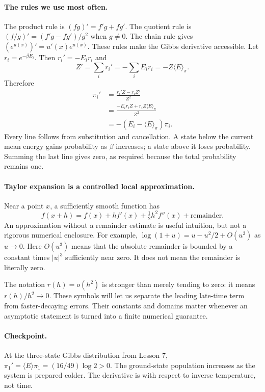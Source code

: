 \paragraph{The rules we use most often.}
The product rule is $(fg)'=f'g+fg'$. The quotient rule is
$(f/g)'=(f'g-fg')/g^2$ when $g\ne0$. The chain rule gives
$(e^{u(x)})'=u'(x)e^{u(x)}$. These rules make the Gibbs derivative accessible.
Let $r_i=e^{-\beta E_i}$. Then $r_i'=-E_i r_i$ and
\[
Z'=\sum_i r_i'=-\sum_i E_i r_i=-Z\langle E\rangle_\pi.
\]
Therefore
\begin{align*}
\pi_i'&=\frac{r_i'Z-r_iZ'}{Z^2}\\
&=\frac{-E_i r_i Z+r_i Z\langle E\rangle_\pi}{Z^2}\\
&=-(E_i-\langle E\rangle_\pi)\pi_i.
\end{align*}
Every line follows from substitution and cancellation. A state below the
current mean energy gains probability as $\beta$ increases; a state above it
loses probability. Summing the last line gives zero, as required because the
total probability remains one.

\paragraph{Taylor expansion is a controlled local approximation.}
Near a point $x$, a sufficiently smooth function has
\[
f(x+h)=f(x)+h f'(x)+\tfrac12h^2f''(x)+\text{remainder}.
\]
An approximation without a remainder estimate is useful intuition, but not a
rigorous numerical enclosure. For example,
$\log(1+u)=u-u^2/2+O(u^3)$ as $u\to0$. Here $O(u^3)$ means that the absolute
remainder is bounded by a constant times $|u|^3$ sufficiently near zero.
It does not mean the remainder is literally zero.

The notation $r(h)=o(h^2)$ is stronger than merely tending to zero: it means
$r(h)/h^2\to0$. These symbols will let us separate the leading late-time term
from faster-decaying errors. Their constants and domains matter whenever an
asymptotic statement is turned into a finite numerical guarantee.

\paragraph{Checkpoint.}
At the three-state Gibbs distribution from Lesson 7,
$\pi_1'=\langle E\rangle\pi_1=(16/49)\log2>0$. The ground-state population
increases as the system is prepared colder. The derivative is with respect to
inverse temperature, not time.

